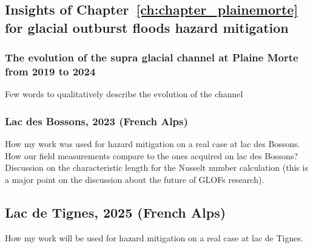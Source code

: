 




\subsection{Insights of Chapter~\ref{ch:chapter_plainemorte} for glacial outburst floods hazard mitigation}

\subsubsection{The evolution of the supra glacial channel at Plaine Morte from 2019 to 2024}

Few words to qualitatively describe the evolution of the channel

\subsubsection{Lac des Bossons, 2023 (French Alps)}

How my work was used for hazard mitigation on a real case at lac des Bossons. How our field measurements compare to the ones acquired on lac des Bossons? Discussion on the characteristic length for the Nusselt number calculation (this is a major point on the discussion about the future of GLOFs research). 

\subsection{Lac de Tignes, 2025 (French Alps)}

How my work will be used for hazard mitigation on a real case at lac de Tignes.


